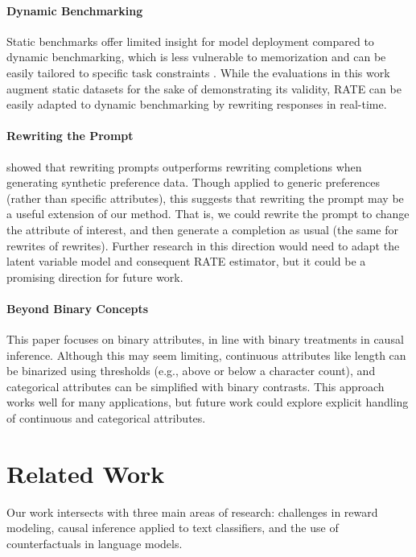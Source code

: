 \documentclass{article}
\begin{document}
\paragraph{Dynamic Benchmarking} Static benchmarks offer limited insight for model deployment compared to dynamic benchmarking, which is less vulnerable to memorization and can be easily tailored to specific task constraints \citep{saxon2024benchmarksmicroscopesmodelmetrology}. While the evaluations in this work augment static datasets for the sake of demonstrating its validity, RATE can be easily adapted to dynamic benchmarking by rewriting responses in real-time.

\paragraph{Rewriting the Prompt} \citet{wang2024selftaughtevaluators} showed that rewriting prompts outperforms rewriting completions when generating synthetic preference data. Though applied to generic preferences (rather than specific attributes), this suggests that rewriting the prompt may be a useful extension of our method. That is, we could rewrite the prompt to change the attribute of interest, and then generate a completion as usual (the same for rewrites of rewrites). Further research in this direction would need to adapt the latent variable model and consequent RATE estimator, but it could be a promising direction for future work.

\paragraph{Beyond Binary Concepts}
This paper focuses on binary attributes, in line with binary treatments in causal inference. Although this may seem limiting, continuous attributes like length can be binarized using thresholds (e.g., above or below a character count), and categorical attributes can be simplified with binary contrasts. This approach works well for many applications, but future work could explore explicit handling of continuous and categorical attributes.

  
\section{Related Work}
\label{sec:related_work}
Our work intersects with three main areas of research: challenges in reward modeling, causal inference applied to text classifiers, and the use of counterfactuals in language models.
\end{document}
